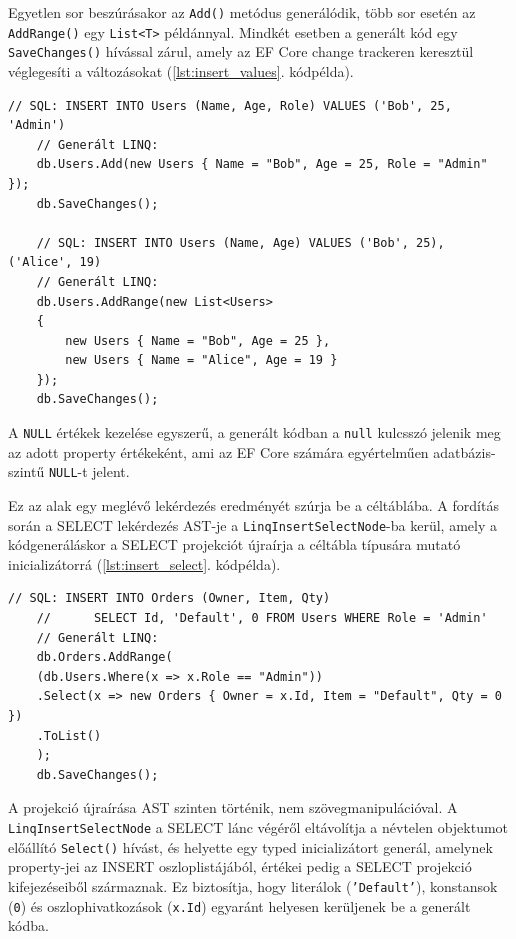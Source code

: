 
Egyetlen sor beszúrásakor az \texttt{Add()} metódus generálódik, több sor esetén az \texttt{AddRange()} egy \texttt{List<T>} példánnyal. Mindkét esetben a generált kód egy \texttt{SaveChanges()} hívással zárul, amely az EF Core change trackeren keresztül véglegesíti a változásokat (\ref{lst:insert_values}. kódpélda).

\begin{lstlisting}[caption={VALUES alapú INSERT fordítása}, label={lst:insert_values}]
	// SQL: INSERT INTO Users (Name, Age, Role) VALUES ('Bob', 25, 'Admin')
	// Generált LINQ:
	db.Users.Add(new Users { Name = "Bob", Age = 25, Role = "Admin" });
	db.SaveChanges();
	
	// SQL: INSERT INTO Users (Name, Age) VALUES ('Bob', 25), ('Alice', 19)
	// Generált LINQ:
	db.Users.AddRange(new List<Users>
	{
		new Users { Name = "Bob", Age = 25 },
		new Users { Name = "Alice", Age = 19 }
	});
	db.SaveChanges();
\end{lstlisting}

A \texttt{NULL} értékek kezelése egyszerű, a generált kódban a \texttt{null} kulcsszó jelenik meg az adott property értékeként, ami az EF Core számára egyértelműen adatbázis-szintű \texttt{NULL}-t jelent.


Ez az alak egy meglévő lekérdezés eredményét szúrja be a céltáblába. A fordítás során a SELECT lekérdezés AST-je a \texttt{LinqInsertSelectNode}-ba kerül, amely a kódgeneráláskor a SELECT projekciót újraírja a céltábla típusára mutató inicializátorrá (\ref{lst:insert_select}. kódpélda).

\begin{lstlisting}[caption={INSERT INTO ... SELECT fordítása}, label={lst:insert_select}]
	// SQL: INSERT INTO Orders (Owner, Item, Qty)
	//      SELECT Id, 'Default', 0 FROM Users WHERE Role = 'Admin'
	// Generált LINQ:
	db.Orders.AddRange(
	(db.Users.Where(x => x.Role == "Admin"))
	.Select(x => new Orders { Owner = x.Id, Item = "Default", Qty = 0 })
	.ToList()
	);
	db.SaveChanges();
\end{lstlisting}

A projekció újraírása AST szinten történik, nem szövegmanipulációval. A \\ \texttt{LinqInsertSelectNode} a SELECT lánc végéről eltávolítja a névtelen objektumot előállító \texttt{Select()} hívást, és helyette egy typed inicializátort generál, amelynek property-jei az INSERT oszloplistájából, értékei pedig a SELECT projekció kifejezéseiből származnak. Ez biztosítja, hogy literálok (\texttt{'Default'}), konstansok (\texttt{0}) és oszlophivatkozások (\texttt{x.Id}) egyaránt helyesen kerüljenek be a generált kódba.

